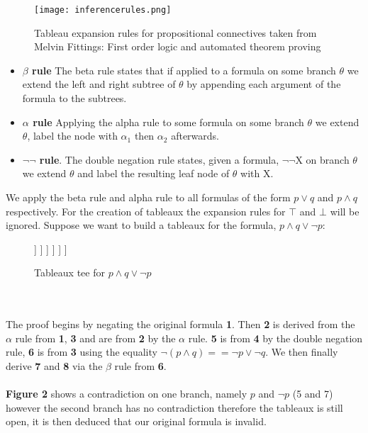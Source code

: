 \documentclass{article}%
\begin{document}
\begin{figure}[h!]
\centering
\texttt{[image: inferencerules.png]}
\caption{Tableau expansion rules for propositional connectives taken from Melvin Fittings: First order logic and automated theorem proving} \cite{fitting_2013}
\label{fig:expansionrules}
\end{figure}
\begin{itemize}
\item \textbf{$\beta$ rule} The beta rule states that if applied to a formula on some branch $\theta$ we extend the left and right subtree of $\theta$ by appending each argument of the formula to the subtrees.
\item \textbf{$\alpha$ rule} Applying the alpha rule to some formula on some branch $\theta$ we extend $\theta$, label the node with $\alpha_1$ then $\alpha_2$ afterwards. 
\item \textbf{$\neg$$\neg$ rule}. The double negation rule states, given a formula,  $\neg$$\neg$X on branch $\theta$ we extend $\theta$ and label the resulting leaf node of $\theta$ with X. 
\end{itemize}
We apply the beta rule and alpha rule to all formulas of the form $p \lor q$ and $p \land q$ respectively. For the creation of tableaux the expansion rules for $\top$ and $\bot$ will be ignored. 
Suppose we want to build a tableaux for the formula, $p\land q\lor \neg{p}$:
\begin{figure}[h!]
\centering
\begin{forest}
[ $\neg (p\land q\lor \neg{p})$  (1)
  [ $\neg (p\land q)\land \neg\neg{p}$ (2)
  	[
	 $\neg (p\land q)$ (3)
	  [
	  	$\neg\neg{p}$ (4)
		[ $p$ (5)
			[$\neg{p} \lor \neg{q} $(6)
				[$\neg{p}$ (7)]
				[$\neg{q}$ (8)]
			]
		]
	  ]
	]
  ]
]
\end{forest}
\caption{Tableaux tee for  $p\land q\lor \neg{p}$}
\label{tableaux}
\end{figure} \\\\
The proof begins by negating the original formula \textbf{1}. Then \textbf{2} is derived from the $\alpha$ rule from \textbf{1}, \textbf{3} and  are from \textbf{2} by the $\alpha$ rule. \textbf{5} is from \textbf{4} by the double negation rule, \textbf{6} is from \textbf{3} using the equality $\neg(p\land q) == \neg{p} \lor \neg{q}$. We then finally derive \textbf{7} and \textbf{8} via the $\beta$ rule from \textbf{6}. \\\\
\textbf{Figure 2} shows a contradiction on one branch, namely $p$ and $\neg{p}$ (5 and 7) however the second branch has no contradiction therefore the tableaux is still open, it is then deduced that our original formula is invalid. 
\end{document}
